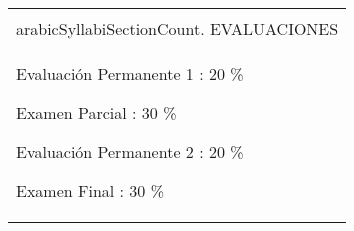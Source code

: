 \documentclass[final]{article}
\begin{document}
\addtocounter{SyllabiSectionCount}{1}
\begin{center}
\begin{tabularx}{\textwidth}{|X|}      \hline
\\arabic{SyllabiSectionCount}. EVALUACIONES  \\ \hline
\begin{evaluation}
	\item[Evaluación Permanente 1] : 20 \%
	\item[Examen Parcial] : 30 \%
	\item[Evaluación Permanente 2] : 20 \%
	\item[Examen Final] : 30 \%
	\end{evaluation}
	\\ \hline
	\end{tabularx}
	\end{center}
	
	
	
	
\end{document}
